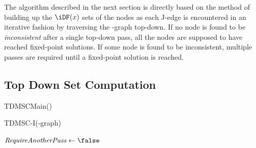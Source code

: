{The algorithm described in the next section is directly based on the method of building up the $\iDF(x)$ sets of the nodes as each J-edge is encountered in an iterative fashion by traversing the \DJ-graph top-down. 
If no node is found to be \emph{inconsistent} after a single top-down pass, all the nodes are supposed to have reached fixed-point solutions. 
If some node is found to be inconsistent, multiple passes are required until a fixed-point solution is reached.


\subsection{Top Down \iDF Set Computation}

\begin{procedure}
  \caption{TDMSCMain()}
  \label{proc:tdmscmain}
\end{procedure}

\begin{function}
  \caption{TDMSC-I(\DJ-graph)}
  \label{proc:alt:tdmscI}
  $\textit{RequireAnotherPass} \gets \false$\;

\end{function}

}
